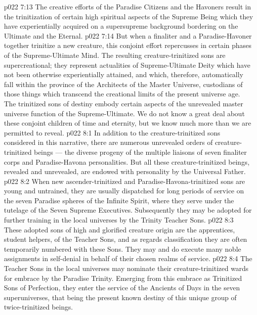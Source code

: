 \vs p022 7:13 \pc {}\bibnobreakspace {} The creative efforts of the Paradise Citizens and the Havoners result in the trinitization of certain high spiritual aspects of the Supreme Being which they have experientially acquired on a supersupreme background bordering on the Ultimate and the Eternal.
\vs p022 7:14 \pc {}\bibnobreakspace {} But when a finaliter and a Paradise\hyp{}Havoner together trinitize a new creature, this conjoint effort repercusses in certain phases of the Supreme\hyp{}Ultimate Mind. The resulting creature\hyp{}trinitized sons are supercreational; they represent actualities of Supreme\hyp{}Ultimate Deity which have not been otherwise experientially attained, and which, therefore, automatically fall within the province of the Architects of the Master Universe, custodians of those things which transcend the creational limits of the present universe age. The trinitized sons of destiny embody certain aspects of the unrevealed master universe function of the Supreme\hyp{}Ultimate. We do not know a great deal about these conjoint children of time and eternity, but we know much more than we are permitted to reveal.
\vs p022 8:1 In addition to the creature\hyp{}trinitized sons considered in this narrative, there are numerous unrevealed orders of creature\hyp{}trinitized beings --- the diverse progeny of the multiple liaisons of seven finaliter corps and Paradise\hyp{}Havona personalities. But all these creature\hyp{}trinitized beings, revealed and unrevealed, are endowed with personality by the Universal Father.
\vs p022 8:2 \pc When new ascender\hyp{}trinitized and Paradise\hyp{}Havona\hyp{}trinitized sons are young and untrained, they are usually dispatched for long periods of service on the seven Paradise spheres of the Infinite Spirit, where they serve under the tutelage of the Seven Supreme Executives. Subsequently they may be adopted for further training in the local universes by the Trinity Teacher Sons.
\vs p022 8:3 These adopted sons of high and glorified creature origin are the apprentices, student helpers, of the Teacher Sons, and as regards classification they are often temporarily numbered with these Sons. They may and do execute many noble assignments in self\hyp{}denial in behalf of their chosen realms of service.
\vs p022 8:4 The Teacher Sons in the local universes may nominate their creature\hyp{}trinitized wards for embrace by the Paradise Trinity. Emerging from this embrace as Trinitized Sons of Perfection, they enter the service of the Ancients of Days in the seven superuniverses, that being the present known destiny of this unique group of twice\hyp{}trinitized beings.
